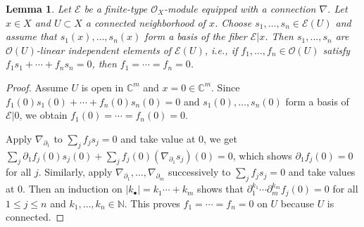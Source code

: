 \documentclass[12pt,a4paper,notitlepage]{report}
\theoremstyle{definition}
\theoremstyle{plain}
\newtheorem{lm}[df]{Lemma}
\newcommand{\id}{\mathbf{1}}
\newcommand{\scr}{\mathscr}
\newcommand{\mbb}{\mathbb}
\newcommand{\blt}{\bullet}
\newcommand{\Cbb}{\mathbb C}
\newcommand{\Nbb}{\mathbb N}
\numberwithin{equation}{section}
\begin{document}






\begin{lm}\label{lb61}
Let $\scr E$ be a finite-type $\scr O_X$-module equipped with a connection $\nabla$. Let $x\in X$ and $U\subset X$ a connected neighborhood of $x$.  Choose $s_1,\dots,s_n\in\scr E(U)$ and assume that $s_1(x),\dots,s_n(x)$ form a basis of the fiber $\scr E|x$. Then $s_1,\dots,s_n$ are $\scr O(U)$-linear independent elements of $\scr E(U)$, i.e., if $f_1,\dots,f_n\in\scr O(U)$ satisfy $f_1s_1+\cdots+f_ns_n=0$, then $f_1=\cdots=f_n=0$.
\end{lm}



\begin{proof}
Assume $U$ is open in $\Cbb^m$ and $x=0\in\Cbb^m$. Since $f_1(0)s_1(0)+\cdots +f_n(0)s_n(0)=0$ and $s_1(0),\dots,s_n(0)$ form a basis of $\scr E|0$, we obtain $f_1(0)=\cdots=f_n(0)=0$.	

Apply $\nabla_{\partial_1}$ to $\sum_j f_js_j=0$ and take value at $0$, we get $\sum_j\partial_1f_j(0)s_j(0)+\sum_j f_j(0)(\nabla_{\partial_1}s_j)(0)=0$, which shows $\partial_1 f_j(0)=0$ for all $j$. Similarly, apply $\nabla_{\partial_1},\dots,\nabla_{\partial_m}$ successively to $\sum_j f_js_j=0$ and take values at $0$. Then an induction on  $|k_\blt|=k_1\cdots+k_m$ shows that $\partial_1^{k_1}\cdots \partial_m^{k_m}f_j(0)=0$ for all $1\leq j\leq n$ and $k_1,\dots,k_n\in\Nbb$. This proves $f_1=\cdots=f_n=0$ on $U$ because $U$ is connected.
\end{proof}



\end{document}
